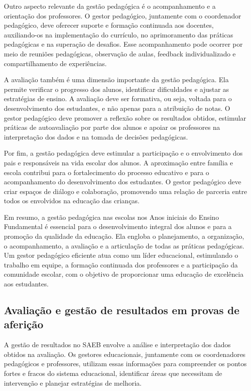 Outro aspecto relevante da gestão pedagógica é o acompanhamento e a
orientação dos professores. O gestor pedagógico, juntamente com o
coordenador pedagógico, deve oferecer suporte e formação continuada aos
docentes, auxiliando-os na implementação do currículo, no aprimoramento
das práticas pedagógicas e na superação de desafios. Esse acompanhamento
pode ocorrer por meio de reuniões pedagógicas, observação de aulas,
feedback individualizado e compartilhamento de experiências.

A avaliação também é uma dimensão importante da gestão pedagógica. Ela
permite verificar o progresso dos alunos, identificar dificuldades e
ajustar as estratégias de ensino. A avaliação deve ser formativa, ou
seja, voltada para o desenvolvimento dos estudantes, e não apenas para a
atribuição de notas. O gestor pedagógico deve promover a reflexão sobre
os resultados obtidos, estimular práticas de autoavaliação por parte dos
alunos e apoiar os professores na interpretação dos dados e na tomada de
decisões pedagógicas.

Por fim, a gestão pedagógica deve estimular a participação e o
envolvimento dos pais e responsáveis na vida escolar dos alunos. A
aproximação entre família e escola contribui para o fortalecimento do
processo educativo e para o acompanhamento do desenvolvimento dos
estudantes. O gestor pedagógico deve criar espaços de diálogo e
colaboração, promovendo uma relação de parceria entre todos os
envolvidos na educação das crianças.

Em resumo, a gestão pedagógica nas escolas nos Anos iniciais do Ensino
Fundamental é essencial para o desenvolvimento integral dos alunos e
para a promoção da qualidade da educação. Ela engloba o planejamento, a
organização, o acompanhamento, a avaliação e a articulação de todas as
práticas pedagógicas. Um gestor pedagógico eficiente atua como um líder
educacional, estimulando o trabalho em equipe, a formação continuada dos
professores e a participação da comunidade escolar, com o objetivo de
proporcionar uma educação de excelência aos estudantes.

\subsection{Avaliação e gestão de resultados em provas de
aferição}\label{avaliauxe7uxe3o-e-gestuxe3o-de-resultados-em-provas-de-aferiuxe7uxe3o}

A gestão de resultados no SAEB envolve a análise e interpretação dos
dados obtidos na avaliação. Os gestores educacionais, juntamente com os
coordenadores pedagógicos e professores, utilizam essas informações para
compreender os pontos fortes e fracos do sistema educacional,
identificar áreas que necessitam de intervenção e planejar estratégias
de melhoria.

